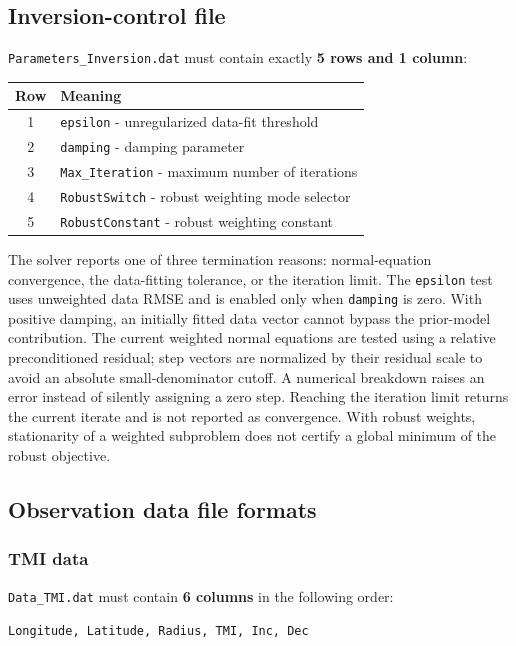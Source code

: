 \documentclass[11pt,a4paper]{article}
\begin{document}
\subsection{Inversion-control file}

\texttt{Parameters\_Inversion.dat} must contain exactly \textbf{5 rows and 1 column}:
\begin{center}
\begin{tabular}{cl}
\toprule
Row & Meaning \\
\midrule
1 & \texttt{epsilon} - unregularized data-fit threshold \\
2 & \texttt{damping} - damping parameter \\
3 & \texttt{Max\_Iteration} - maximum number of iterations \\
4 & \texttt{RobustSwitch} - robust weighting mode selector \\
5 & \texttt{RobustConstant} - robust weighting constant \\
\bottomrule
\end{tabular}
\end{center}

The solver reports one of three termination reasons: normal-equation
convergence, the data-fitting tolerance, or the iteration limit. The
\texttt{epsilon} test uses unweighted data RMSE and is enabled only when
\texttt{damping} is zero. With positive damping, an initially fitted data
vector cannot bypass the prior-model contribution. The current weighted
normal equations are tested using a relative preconditioned residual;
step vectors are normalized by their residual scale to avoid an absolute
small-denominator cutoff. A numerical breakdown raises an error instead
of silently assigning a zero step. Reaching the iteration limit returns
the current iterate and is not reported as convergence. With robust
weights, stationarity of a weighted subproblem does not certify a global
minimum of the robust objective.

\subsection{Observation data file formats}

\subsubsection{TMI data}

\texttt{Data\_TMI.dat} must contain \textbf{6 columns} in the following order:
\begin{center}
\texttt{Longitude, Latitude, Radius, TMI, Inc, Dec}
\end{center}
\end{document}
